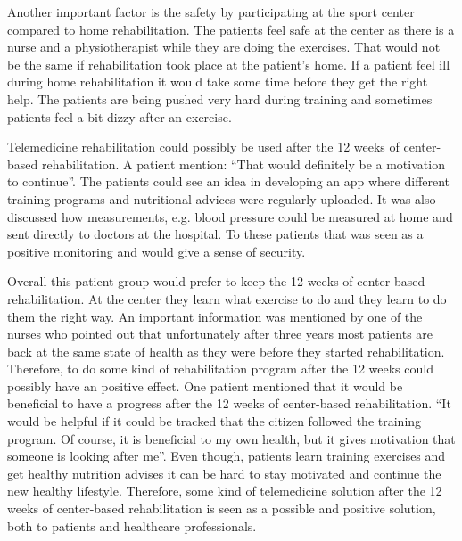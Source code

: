 Another important factor is the safety by participating at the sport center compared to home rehabilitation. The patients feel safe at the center as there is a nurse and a physiotherapist while they are doing the exercises. That would not be the same if rehabilitation took place at the patient’s home. If a patient feel ill during home rehabilitation it would take some time before they get the right help. The patients are being pushed very hard during training and sometimes patients feel a bit dizzy after an exercise. 

Telemedicine rehabilitation could possibly be used after the 12 weeks of center-based rehabilitation. A patient mention: “That would definitely be a motivation to continue”. The patients could see an idea in developing an app where different training programs and nutritional advices were regularly uploaded. It was also discussed how measurements, e.g. blood pressure could be measured at home and sent directly to doctors at the hospital. To these patients that was seen as a positive monitoring and would give a sense of security.  

Overall this patient group would prefer to keep the 12 weeks of center-based rehabilitation. At the center they learn what exercise to do and they learn to do them the right way. An important information was mentioned by one of the nurses who pointed out that unfortunately after three years most patients are back at the same state of health as they were before they started rehabilitation. Therefore, to do some kind of rehabilitation program after the 12 weeks could possibly have an positive effect. One patient mentioned that it would be beneficial to have a progress after the 12 weeks of center-based rehabilitation. “It would be helpful if it could be tracked that the citizen followed the training program. Of course, it is beneficial to my own health, but it gives motivation that someone is looking after me”. Even though, patients learn training exercises and get healthy nutrition advises it can be hard to stay motivated and continue the new healthy lifestyle. Therefore, some kind of telemedicine solution after the 12 weeks of center-based rehabilitation is seen as a possible and positive solution, both to patients and healthcare professionals.        


















































